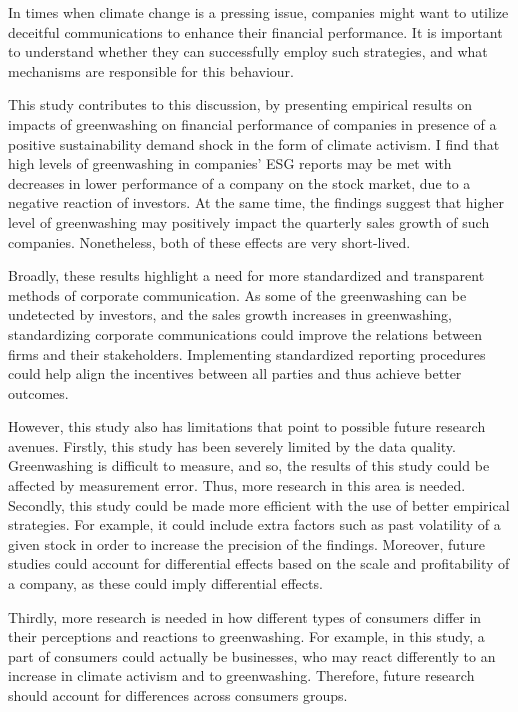 \documentclass[12pt]{article}
\begin{document}

In times when climate change is a pressing issue, companies might want to utilize deceitful communications to enhance their financial performance. It is important to understand whether they can successfully employ such strategies, and what mechanisms are responsible for this behaviour. 

This study contributes to this discussion, by presenting empirical results on impacts of greenwashing on financial performance of companies in presence of a positive sustainability demand shock in the form of climate activism. I find that high levels of greenwashing in companies' ESG reports may be met with decreases in lower performance of a company on the stock market, due to a negative reaction of investors. At the same time, the findings suggest that higher level of greenwashing may positively impact the quarterly sales growth of such companies. Nonetheless, both of these effects are very short-lived. 

Broadly, these results highlight a need for more standardized and transparent methods of corporate communication. As some of the greenwashing can be undetected by investors, and the sales growth increases in greenwashing, standardizing corporate communications could improve the relations between firms and their stakeholders. Implementing standardized reporting procedures could help align the incentives between all parties and thus achieve better outcomes. 

However, this study also has limitations that point to possible future research avenues. Firstly, this study has been severely limited by the data quality. Greenwashing is difficult to measure, and so, the results of this study could be affected by measurement error. Thus, more research in this area is needed. Secondly, this study could be made more efficient with the use of better empirical strategies. For example, it could include extra factors such as past volatility of a given stock in order to increase the precision of the findings. Moreover, future studies could account for differential effects based on the scale and profitability of a company, as these could imply differential effects. 

Thirdly, more research is needed in how different types of consumers differ in their perceptions and reactions to greenwashing. For example, in this study, a part of consumers could actually be businesses, who may react differently to an increase in climate activism and to greenwashing. Therefore, future research should account for differences across consumers groups. 
\end{document}
